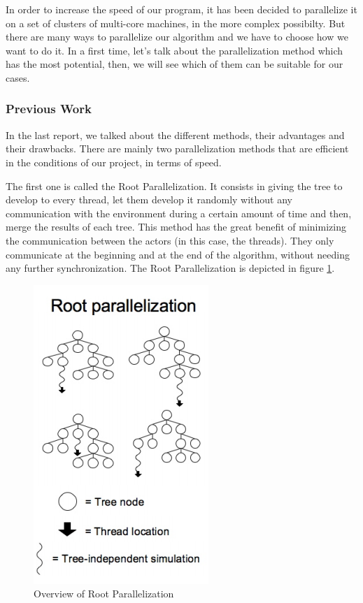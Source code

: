 In order to increase the speed of our program, it has been decided to parallelize it on a set of clusters of multi-core machines, in the more complex possibilty. But there are many ways to parallelize our algorithm and we have to choose how we want to do it. In a first time, let's talk about the parallelization method which has the most potential, then, we will see which of them can be suitable for our cases.
\subsubsection{Previous Work}
In the last report, we talked about the different methods, their advantages and their drawbacks. There are mainly two parallelization methods that are efficient in the conditions of our project, in terms of speed.

The first one is called the Root Parallelization. It consists in giving the tree to develop to every thread, let them develop it randomly without any communication with the environment
during a certain amount of time and then, merge the results of each tree.
This method has the great benefit of minimizing the communication between the actors (in this case, the threads).
They only communicate at the beginning and at the end of the algorithm, without needing any further synchronization. The Root Parallelization is depicted in figure \ref{fig:root}.

\begin{figure}[!ht] 
\centerline{\includegraphics[scale=0.60]{3Methods/3.1Parallelization_Method/root.png}}
   \caption{Overview of Root Parallelization \cite{parallel_comp}}
\label{fig:root}
\end{figure}

